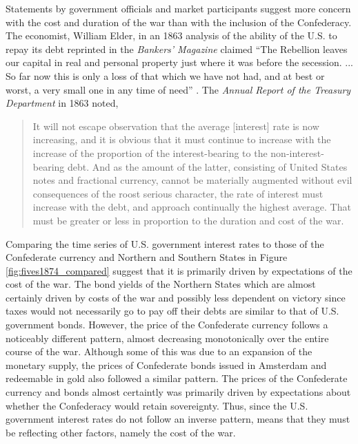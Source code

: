 Statements by government officials and market participants suggest more concern with the cost and duration of the war than with the inclusion of the Confederacy.
The economist, William Elder, in an 1863 analysis of the ability of the U.S. to repay its debt reprinted in the \textit{Bankers'  Magazine} claimed ``The Rebellion leaves our capital in real and personal property just where it was before the secession. ... So far now this is only a loss of that which we have not had, and at best or worst, a very small one in any time of need'' \parencite[19]{Elder1863}.
The \textit{Annual Report of the Treasury Department} in 1863 noted,
\begin{quote}
It will not escape observation that the average [interest] rate is now increasing,
and it is obvious that it must continue to increase with the increase of the proportion
of the interest-bearing to the non-interest-bearing debt. And as the
amount of the latter, consisting of United States notes and fractional currency,
cannot be materially augmented without evil consequences of the roost serious
character, the rate of interest must increase with the debt, and approach continually
the highest average. That must be greater or less in proportion to the
duration and cost of the war. \parencite[13]{Treasury1863}
\end{quote}

Comparing the time series of U.S. government interest rates to those of the Confederate currency and Northern and Southern States in Figure \ref{fig:fives1874_compared} suggest that it is primarily driven by expectations of the cost of the war.
The bond yields of the Northern States which are almost certainly driven by costs of the war and possibly less dependent on victory since taxes would not necessarily go to pay off their debts are similar to that of U.S. government bonds.
However, the price of the Confederate currency follows a noticeably different pattern, almost decreasing monotonically over the entire course of the war.
Although some of this was due to an expansion of the monetary supply, the prices of Confederate bonds issued in Amsterdam and redeemable in gold also followed a similar pattern.
The prices of the Confederate currency and bonds almost certaintly was primarily driven by expectations about whether the Confederacy would retain sovereignty.
Thus, since the U.S. government interest rates do not follow an inverse pattern, means that they must be reflecting other factors, namely the cost of the war.

